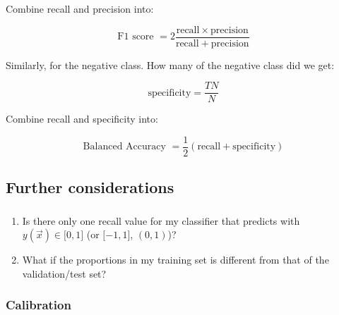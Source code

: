 \begin{frame}
{Combine recall and precision into:

\begin{equation}
\text{F1 score }
 = 2 \frac{\mathrm{recall} \times \mathrm{precision}}{\mathrm{recall} + \mathrm{precision}}
\end{equation}

Similarly, for the negative class. How many of the negative class did we get:

\begin{equation}
\text{specificity}
 = \frac{TN}{N}
\end{equation}


Combine recall and specificity into:


\begin{equation}
\text{Balanced Accuracy }
 = \frac{1}{2} (\mathrm{recall} + \mathrm{specificity})
\end{equation}

}

\end{frame}

\subsection{Further considerations}

\begin{frame}\frametitle{\subsecname}

\begin{enumerate}
\item
Is there only one recall value for my classifier that predicts with\\
 $y(\vec x) \in \lbrack0,1\rbrack$ (or $\lbrack-1,1\rbrack$, $(0,1)$)?
\item
What if the proportions in my training set is different from that of the validation/test set?
\end{enumerate}


\end{frame}

\subsubsection{Calibration}

